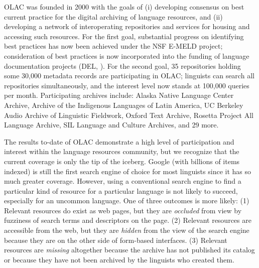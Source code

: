
OLAC was founded in 2000 with the goals of (i) developing consensus on
best current practice for the digital archiving of language resources,
and (ii) developing a network of interoperating repositories and
services for housing and accessing such resources.  For the first
goal, substantial progress on identifying best practices has now been
achieved under the NSF E-MELD project; consideration of best practices
is now incorporated into the funding of language documentation
projects (DEL, \citet{BirdSimons03language}).  For the second goal,
35 repositories holding some 30,000 metadata records are
participating in OLAC; linguists can search all repositories
simultaneously, and the interest level now stands
at 100,000 queries per month.  Participating archives include:
Alaska Native Language Center Archive,
Archive of the Indigenous Languages of Latin America,
UC Berkeley Audio Archive of Linguistic Fieldwork,
Oxford Text Archive, Rosetta Project All Language Archive, 
SIL Language and Culture Archives, and 29 more.



The results to-date of OLAC demonstrate a high level of participation
and interest within the language resources community, but we recognize
that the current coverage is only the 
tip of the iceberg. Google (with billions of items indexed) is still
the first search engine of choice for most linguists since it has so
much greater coverage. However, using a conventional search engine to
find a particular kind of resource for a particular language is
not likely to succeed, especially for an uncommon language. 
One of three outcomes is more likely:
(1) Relevant resources do exist as web pages, but they are 
{\it occluded} from view by fuzziness of search terms and 
descriptors on the page.
(2) Relevant resources are accessible from the web, but they are
{\it hidden} from the view of the search engine because they are
on the other side of form-based interfaces.
(3) Relevant resources are {\it missing} altogether because the
archive has not published its catalog or because they have not
been archived by the linguists who created them.

